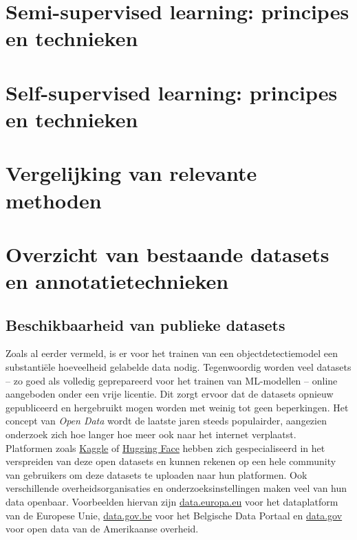 \section{Semi-supervised learning: principes en technieken}

\lipsum[1-3]

\section{Self-supervised learning: principes en technieken}

\lipsum[1-3]

\section{Vergelijking van relevante methoden}

\lipsum[1-3]

\section{Overzicht van bestaande datasets en annotatietechnieken}

\subsection{Beschikbaarheid van publieke datasets}

Zoals al eerder vermeld, is er voor het trainen van een objectdetectiemodel een substantiële hoeveelheid gelabelde data nodig. Tegenwoordig worden veel datasets -- zo goed als volledig geprepareerd voor het trainen van ML-modellen -- online aangeboden onder een vrije licentie. Dit zorgt ervoor dat de datasets opnieuw gepubliceerd en hergebruikt mogen worden met weinig tot geen beperkingen. Het concept van \emph{Open Data} wordt de laatste jaren steeds populairder, aangezien onderzoek zich hoe langer hoe meer ook naar het internet verplaatst. \autocite{Murray_Rust_2008} \\

Platformen zoals \href{https://www.kaggle.com/datasets}{Kaggle} of \href{https://huggingface.co/datasets}{Hugging Face} hebben zich gespecialiseerd in het verspreiden van deze open datasets en kunnen rekenen op een hele community van gebruikers om deze datasets te uploaden naar hun platformen. Ook verschillende overheidsorganisaties en onderzoeksinstellingen maken veel van hun data openbaar. Voorbeelden hiervan zijn \href{https://data.europa.eu/}{data.europa.eu} voor het dataplatform van de Europese Unie, \href{https://data.gov.be/nl}{data.gov.be} voor het Belgische Data Portaal en \href{https://data.gov/}{data.gov} voor open data van de Amerikaanse overheid. \\

